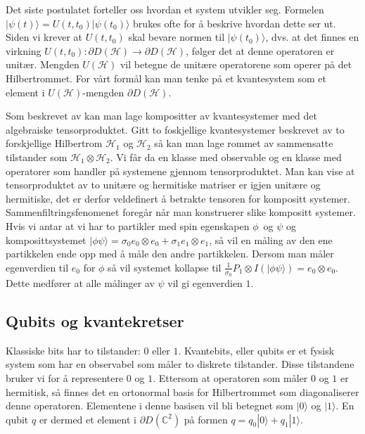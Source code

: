         Det siste postulatet forteller oss hvordan et system utvikler seg. Formelen $|\psi (t)\rangle = U(t,t_0)|\psi (t_0)\rangle$ brukes ofte for å beskrive hvordan dette ser ut. Siden vi krever at $U(t,t_0)$ skal bevare normen til $|\psi (t_0)\rangle$, dvs. at det finnes en virkning $U(t,t_0):\partial D(\mathcal{H})\rightarrow\partial D(\mathcal{H})$, følger det at denne operatoren er unitær. Mengden $U(\mathcal{H})$ vil betegne de unitære operatorene som operer på det Hilbertrommet. For vårt formål kan man tenke på et kvantesystem som et element i $U(\mathcal{H})$-mengden $\partial D(\mathcal{H})$.

        Som beskrevet av \cite{portugal_2019} kan man lage kompositter av kvantesystemer med det algebraiske tensorproduktet. Gitt to foskjellige kvantesystemer beskrevet av to forskjellige Hilbertrom $\mathcal{H}_1$ og $\mathcal{H}_2$ så kan man lage rommet av sammensatte tilstander som $\mathcal{H}_1\otimes\mathcal{H}_2$. Vi får da en klasse med observable og en klasse med operatorer som handler på systemene gjennom tensorproduktet. Man kan vise at tensorproduktet av to unitære og hermitiske matriser er igjen unitære og hermitiske, det er derfor veldefinert å betrakte tensoren for kompositt systemer. Sammenfiltringsfenomenet foregår når man konstruerer slike kompositt systemer. Hvis vi antar at vi har to partikler med spin egenskapen $\phi$ og $\psi$ og komposittsystemet $|\phi\psi\rangle = \sigma_0e_0\otimes e_0 + \sigma_1e_1\otimes e_1$, så vil en måling av den ene partikkelen ende opp med å måle den andre partikkelen. Dersom man måler egenverdien til $e_0$ for $\phi$ så vil systemet kollapse til $\frac{1}{\sigma_0}P_1\otimes I(|\phi\psi\rangle) = e_0\otimes e_0$. Dette medfører at alle målinger av $\psi$ vil gi egenverdien $1$.

\subsection{Qubits og kvantekretser}
    
        Klassiske bits har to tilstander: $0$ eller $1$. Kvantebits, eller qubits er et fysisk system som har en observabel som måler to diskrete tilstander. Disse tilstandene bruker vi for å representere $0$ og $1$. Ettersom at operatoren som måler $0$ og $1$ er hermitisk, så finnes det en ortonormal basis for Hilbertrommet som diagonaliserer denne operatoren. Elementene i denne basisen vil bli betegnet som $|0\rangle$ og $|1\rangle$. En qubit $q$ er dermed et element i $\partial D(\mathbb{C}^2)$ på formen $q = q_0|0\rangle + q_1|1\rangle$. 

